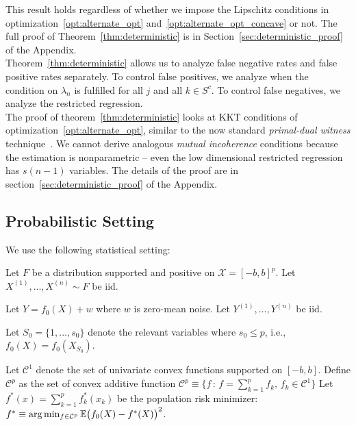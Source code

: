This result holds regardless of whether we impose the Lipschitz conditions in optimization~\ref{opt:alternate_opt} and~\ref{opt:alternate_opt_concave} or not.
The full proof of Theorem~\ref{thm:deterministic} is in Section~\ref{sec:deterministic_proof} of the Appendix.\\

Theorem~\ref{thm:deterministic} allows us to analyze false negative
rates and false positive rates separately. To control false positives,
we analyze when the condition on $\lambda_n$ is fulfilled for all $j$ and all $k \in S^c$. To control false negatives, we analyze the restricted regression. \\

The proof of theorem~\ref{thm:deterministic} looks at KKT conditions of optimization~\ref{opt:alternate_opt}, similar to the now standard \emph{primal-dual witness} technique~\cite{wainwright2009sharp}. We cannot derive analogous \emph{mutual incoherence} conditions because the estimation is nonparametric -- even the low dimensional restricted regression has $s(n-1)$ variables. The details of the proof are in section~\ref{sec:deterministic_proof} of the Appendix.

\subsection{Probabilistic Setting}

We use the following statistical setting:

\begin{packed_enum}
\item Let $F$ be a distribution supported and positive on $\mathcal{X}=[-b,b]^p$. Let $X^{(1)},..., X^{(n)} \sim F$ be iid.
\item Let $Y = f_0(X) + w$ where $w$ is zero-mean noise. Let $Y^{(1)},...,Y^{(n)}$ be iid.
\item Let $S_0 = \{1,...,s_0\}$ denote the relevant variables where $s_0 \leq p$, i.e.,
  $f_0(X) = f_0(X_{S_0})$.
\end{packed_enum}


Let $\mathcal{C}^1$ denote the set of univariate convex functions supported on $[-b,b]$. Define $\mathcal{C}^{p}$ as the set of convex additive function
$\mathcal{C}^p \equiv \{ f \,:\, f = \sum_{k=1}^p f_k, \,
   f_k \in \mathcal{C}^1 \} $
Let $f^*(x) = \sum_{k=1}^p f^*_k(x_k)$ be the population risk minimizer:
$f^* \equiv \arg\min_{f \in \mathcal{C}^p} {\mathbb E}\big(f_0(X) - f^*(X) \big)^2$.\\

